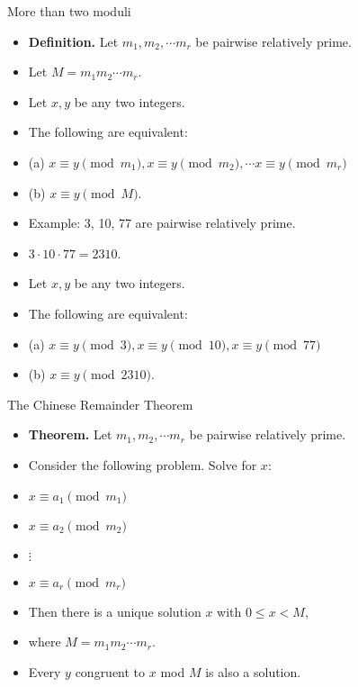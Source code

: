 \documentclass{beamer}
\begin{document}
\begin{frame}{More than two moduli}

\begin{itemize}
  \item \textbf{Definition.} Let $m_1, m_2, \cdots m_r$  be pairwise relatively prime.
  \item Let $M= m_1 m_2 \cdots m_r$.
  \item Let $x,y$ be any two integers.
  \item The following are equivalent:
  \item (a) $x\equiv y \pmod {m_1}, x\equiv y \pmod {m_2}, \cdots x\equiv y \pmod {m_r}$
  \item (b) $x\equiv y \pmod M$.
  \item Example: 3, 10, 77 are pairwise relatively prime.
  \item $3\cdot 10 \cdot 77 = 2310$.
  \item Let $x,y$ be any two integers.
  \item The following are equivalent:
  \item (a) $x\equiv y \pmod {3}, x\equiv y \pmod {10}, x\equiv y \pmod {77}$
  \item (b) $x\equiv y \pmod {2310}$.
\end{itemize}

\end{frame}


\begin{frame}{The Chinese Remainder Theorem}

\begin{itemize}
  \item \textbf{Theorem.} Let $m_1, m_2, \cdots m_r$  be pairwise relatively prime.
  \item Consider the following problem. Solve for $x$:
  \item $x \equiv a_1 \pmod {m_1}$
  \item $x \equiv a_2 \pmod {m_2}$
  \item $\vdots$
  \item $x \equiv a_r \pmod {m_r}$
  \item Then there is a unique solution $x$ with $0\leq x < M$,
  \item where $M=m_1 m_2 \cdots m_r$.
  \item Every $y$ congruent to $x$ mod $M$ is also a solution.
\end{itemize}

\end{frame}
\end{document}
